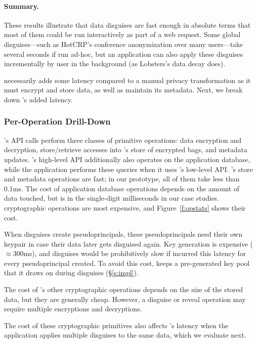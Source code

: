 \paragraph{Summary.}
%
These results illustrate that data disguises are fast enough in absolute terms
that most of them could be run interactively as part of a web request.
%
Some global disguises---such as HotCRP's conference anonymization over many
users---take several seconds if run ad-hoc, but an application can also apply
these disguises incrementally by user in the background (as Lobsters's data decay
does).
%

%
\sys necessarily adds some latency compared to a manual privacy transformation
as it must encrypt and store data, as well as maintain its metadata.
%
Next, we break down \sys's added latency.
%

\subsubsection{\sys Per-Operation Drill-Down}
%
\sys's API calls perform three classes of primitive operations: data encryption
and decryption, store/retrieve accesses into \sys's store of encrypted bags,
and metadata updates.
%
\sys's high-level API additionally also operates on the application database,
while the application performs these queries when it uses \sys's low-level API.
%
\sys's store and metadata operations are fast; in our prototype, all of them
take less than 0.1ms.
%
The cost of application database operations depends on the amount of data
touched, but is in the single-digit milliseconds in our case studies.
%
\sys cryptographic operations are most expensive, and Figure~\ref{f:opstats}
shows their cost.
%

%
When disguises create pseudoprincipals, these pseudoprincipals need their
own keypair in case their data later gets disguised again.
%
Key generation is expensive ($\approx$300ms), and disguises would be
prohibitively slow if \sys incurred this latency for every pseudoprincipal
created.
%
To avoid this cost, \sys keeps a pre-generated key pool that it draws on
during disguises (\S\ref{s:impl}).
%

%
The cost of \sys's other cryptographic operations depends on the size of the
stored data, but they are generally cheap.
%
However, a disguise or reveal operation may require multiple encryptions and
decryptions.
%
%

%
The cost of these cryptographic primitives also affects \sys's latency when
the application applies multiple disguises to the same data, which we
evaluate next.
%

